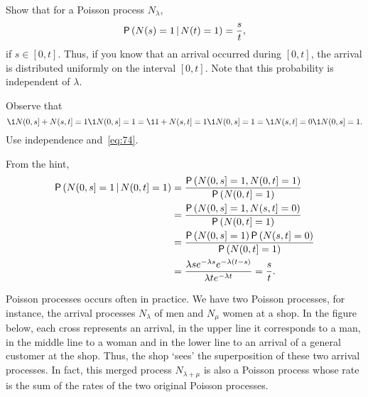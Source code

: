 \begin{extra}
Show that  for a Poisson process $N_\lambda$, 
\begin{equation*}
\P{N(s) =1\given N(t)=1} = \frac s t,
\end{equation*}
if $s\in[0,t]$. Thus, if you know that an arrival occurred during $[0,t]$, the arrival is distributed
uniformly on the interval $[0,t]$. Note that this probability is independent of $\lambda$. 
\begin{hint}
 Observe that 
  \begin{equation*}
\1{N(0,s]+N(s,t]=1}\1{N(0,s]=1} = \1{1+N(s,t]=1}\1{N(0,s]=1}=\1{N(s,t]=0}\1{N(0,s]=1}.
  \end{equation*}
Use  independence and~\eqref{eq:74}.
\end{hint}
\begin{solution}
From the hint,
\begin{align*}
  \P{N(0,s] =1\given N(0,t]=1} 
&= \frac{\P{N(0,s] =1, N(0,t]=1}}{\P{N(0,t]=1}} \\
&= \frac{\P{N(0,s] =1, N(s,t]=0}}{\P{N(0,t]=1}} \\
&= \frac{\P{N(0,s] =1}\P{N(s,t]=0}}{\P{N(0,t]=1}} \\
&= \frac{\lambda s e^{-\lambda s} e^{-\lambda (t-s)}}{\lambda t e^{-\lambda t}} = \frac s t.
\end{align*}
\end{solution}
\end{extra}
 


 Poisson processes occurs often in practice.
We have two Poisson processes, for instance, the arrival processes $N_\lambda$ of men and $N_\mu$ women at a shop.
In the figure below, each cross represents an arrival, in the upper line it corresponds to a man, in the middle line to a woman and in the lower line to an arrival of a general customer at the shop.
Thus, the shop `sees' the superposition of these two arrival processes.
In fact, this merged process $N_{\lambda+\mu}$ is also a Poisson process whose rate is the sum of the rates of the two original Poisson processes.


